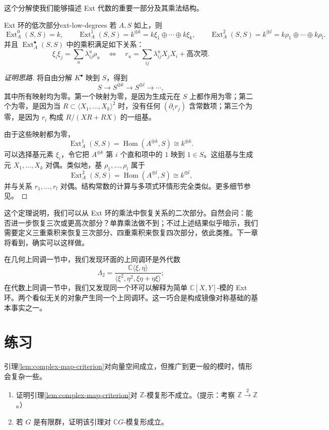 这个分解使我们能够描述 Ext 代数的重要一部分及其乘法结构。
\begin{theorem}{Ext 环的低次部分}{ext-low-degrees}
若 $A,S$ 如上，则
\[
  \operatorname{Ext}_A^0(S,S)=k,\qquad
  \operatorname{Ext}_A^1(S,S)=k^{\oplus k}
    =k\xi_1\oplus\cdots\oplus k\xi_k,\qquad
  \operatorname{Ext}_A^2(S,S)=k^{\oplus l}
    =k\rho_1\oplus\cdots\oplus k\rho_l.
\]
并且 $\operatorname{Ext}_A^\bullet(S,S)$ 中的乘积满足如下关系：
\[
  \xi_i\xi_j=\sum_u\lambda^u_{ij}\rho_u
  \quad\Longleftrightarrow\quad
  r_u=\sum_{ij}\lambda^u_{ij}X_jX_i+\text{高次项}.
\]
\end{theorem}
\begin{proof}[证明思路]
将自由分解 $K^\bullet$ 映到 $S$，得到
\[
  S\longrightarrow S^{\oplus k}\longrightarrow S^{\oplus l}
  \longrightarrow\cdots,
\]
其中所有映射均为零。第一个映射为零，是因为生成元在 $S$ 上都作用为零；第二个为零，是因为当 $R\subset\langle X_1,\ldots,X_k\rangle^2$ 时，没有任何 $(\partial_i r_j)$ 含常数项；第三个为零，是因为 $r_i$ 构成 $R/(XR+RX)$ 的一组基。

由于这些映射都为零，
\[
  \operatorname{Ext}_A^1(S,S)=\operatorname{Hom}(A^{\oplus k},S)\cong k^{\oplus k}.
\]
可以选择基元素 $\xi_i$，令它把 $A^{\oplus k}$ 第 $i$ 个直和项中的 $1$ 映到 $1\in S$。这组基与生成元 $X_1,\ldots,X_k$ 对偶。类似地，基 $\rho_1,\ldots,\rho_l$ 属于
\[
  \operatorname{Ext}_A^2(S,S)=\operatorname{Hom}(A^{\oplus l},S)\cong k^{\oplus l},
\]
并与关系 $r_1,\ldots,r_l$ 对偶。结构常数的计算与多项式环情形完全类似。更多细节参见。
\end{proof}

\begin{note}
这个定理说明，我们可以从 Ext 环的乘法中恢复关系的二次部分。自然会问：能否进一步恢复三次或更高次部分？单靠乘法做不到；不过上述结果似乎暗示，我们需要定义三重乘积来恢复三次部分、四重乘积来恢复四次部分，依此类推。下一章将看到，确实可以这样做。
\end{note}

\begin{note}
在几何上同调一节中，我们发现环面的上同调环是外代数
\[
  \Lambda_2=\frac{\mathbb C\langle\xi,\eta\rangle}
  {\langle\xi^2,\eta^2,\xi\eta+\eta\xi\rangle};
\]
在代数上同调一节中，我们又发现同一个环可以解释为简单 $\mathbb C[X,Y]$-模的 Ext 环。两个看似无关的对象产生同一个上同调环。这一巧合是构成镜像对称基础的基本事实之一。
\end{note}

\section{练习}\label{sec:cohomology-exercises}
\begin{exercise}\label{exer:cohomology-module-complexes}
引理\ref{lem:complex-map-criterion}对向量空间成立，但推广到更一般的模时，情形会复杂一些。
\begin{enumerate}
  \item 证明引理\ref{lem:complex-map-criterion}对 $\mathbb Z$-模复形不成立。（提示：考察 $\mathbb Z\xrightarrow{2}\mathbb Z$。）
  \item 若 $G$ 是有限群，证明该引理对 $\mathbb C G$-模复形成立。
\end{enumerate}
\end{exercise}

